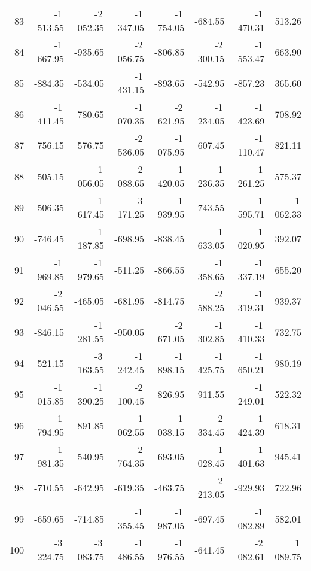 \begin{longtable}{rrrrrrrr}
83 & -1\,513.55 & -2\,052.35 & -1\,347.05 & -1\,754.05 & -684.55 & -1\,470.31 & 513.26  \\
84 & -1\,667.95 & -935.65 & -2\,056.75 & -806.85 & -2\,300.15 & -1\,553.47 & 663.90  \\
85 & -884.35 & -534.05 & -1\,431.15 & -893.65 & -542.95 & -857.23 & 365.60  \\
86 & -1\,411.45 & -780.65 & -1\,070.35 & -2\,621.95 & -1\,234.05 & -1\,423.69 & 708.92  \\
87 & -756.15 & -576.75 & -2\,536.05 & -1\,075.95 & -607.45 & -1\,110.47 & 821.11  \\
88 & -505.15 & -1\,056.05 & -2\,088.65 & -1\,420.05 & -1\,236.35 & -1\,261.25 & 575.37  \\
89 & -506.35 & -1\,617.45 & -3\,171.25 & -1\,939.95 & -743.55 & -1\,595.71 & 1\,062.33  \\
90 & -746.45 & -1\,187.85 & -698.95 & -838.45 & -1\,633.05 & -1\,020.95 & 392.07  \\
91 & -1\,969.85 & -1\,979.65 & -511.25 & -866.55 & -1\,358.65 & -1\,337.19 & 655.20  \\
92 & -2\,046.55 & -465.05 & -681.95 & -814.75 & -2\,588.25 & -1\,319.31 & 939.37  \\
93 & -846.15 & -1\,281.55 & -950.05 & -2\,671.05 & -1\,302.85 & -1\,410.33 & 732.75  \\
94 & -521.15 & -3\,163.55 & -1\,242.45 & -1\,898.15 & -1\,425.75 & -1\,650.21 & 980.19  \\
95 & -1\,015.85 & -1\,390.25 & -2\,100.45 & -826.95 & -911.55 & -1\,249.01 & 522.32  \\
96 & -1\,794.95 & -891.85 & -1\,062.55 & -1\,038.15 & -2\,334.45 & -1\,424.39 & 618.31  \\
97 & -1\,981.35 & -540.95 & -2\,764.35 & -693.05 & -1\,028.45 & -1\,401.63 & 945.41  \\
98 & -710.55 & -642.95 & -619.35 & -463.75 & -2\,213.05 & -929.93 & 722.96  \\
99 & -659.65 & -714.85 & -1\,355.45 & -1\,987.05 & -697.45 & -1\,082.89 & 582.01  \\
100 & -3\,224.75 & -3\,083.75 & -1\,486.55 & -1\,976.55 & -641.45 & -2\,082.61 & 1\,089.75  \\

\end{longtable}

